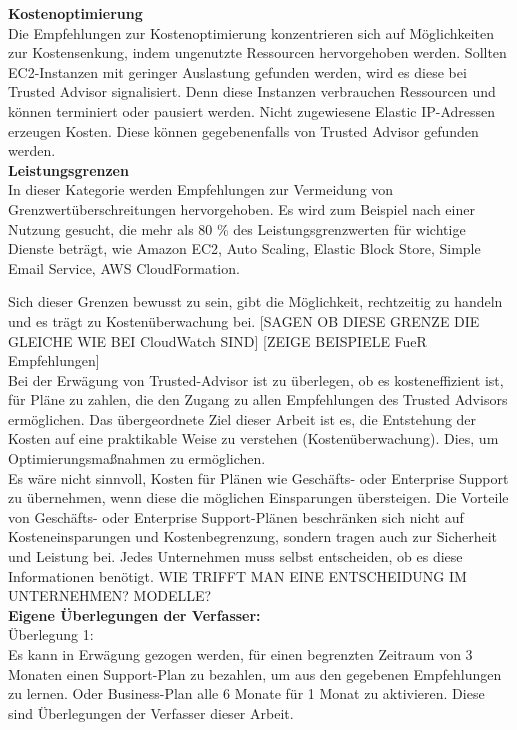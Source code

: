 \textbf{Kostenoptimierung}\\
Die Empfehlungen zur Kostenoptimierung konzentrieren sich auf Möglichkeiten zur Kostensenkung, indem ungenutzte Ressourcen hervorgehoben werden. 
Sollten EC2-Instanzen mit geringer Auslastung gefunden werden, wird es diese bei Trusted Advisor signalisiert. Denn diese Instanzen verbrauchen Ressourcen und können terminiert oder pausiert werden. 
Nicht zugewiesene Elastic IP-Adressen erzeugen Kosten. Diese können gegebenenfalls von Trusted Advisor gefunden werden. %
\\

\textbf{Leistungsgrenzen}\\
In dieser Kategorie werden Empfehlungen zur Vermeidung von Grenzwertüberschreitungen hervorgehoben.
Es wird zum Beispiel nach einer Nutzung gesucht, die mehr als 80 \% des Leistungsgrenzwerten für wichtige Dienste beträgt, wie  Amazon EC2, Auto Scaling, Elastic Block Store, Simple Email Service, AWS CloudFormation.

Sich dieser Grenzen bewusst zu sein, gibt die Möglichkeit, rechtzeitig zu handeln und es trägt zu Kostenüberwachung bei.
[SAGEN OB DIESE GRENZE DIE GLEICHE WIE BEI CloudWatch SIND]
[ZEIGE BEISPIELE FueR Empfehlungen]\\
Bei der Erwägung von Trusted-Advisor ist zu überlegen, ob es kosteneffizient ist, für Pläne zu zahlen, die den Zugang zu allen Empfehlungen des Trusted Advisors ermöglichen. Das übergeordnete Ziel dieser Arbeit ist es, die Entstehung der Kosten auf eine praktikable Weise zu verstehen (Kostenüberwachung). Dies, um Optimierungsmaßnahmen zu ermöglichen. 
\\
Es wäre nicht sinnvoll, Kosten für Plänen wie Geschäfts- oder Enterprise Support zu übernehmen, wenn diese die möglichen Einsparungen übersteigen.  Die Vorteile von Geschäfts- oder Enterprise Support-Plänen beschränken sich nicht auf Kosteneinsparungen und Kostenbegrenzung, sondern tragen auch zur Sicherheit und Leistung bei. Jedes Unternehmen muss selbst entscheiden, ob es diese Informationen benötigt.
WIE TRIFFT MAN EINE ENTSCHEIDUNG IM UNTERNEHMEN? MODELLE?
\\
\textbf{Eigene Überlegungen der Verfasser:} \\
Überlegung 1: \\
Es kann in Erwägung gezogen werden, für einen begrenzten Zeitraum von 3 Monaten einen Support-Plan zu bezahlen, um aus den gegebenen Empfehlungen zu lernen. Oder Business-Plan alle 6 Monate für 1 Monat zu aktivieren. Diese sind Überlegungen der Verfasser dieser Arbeit. 


